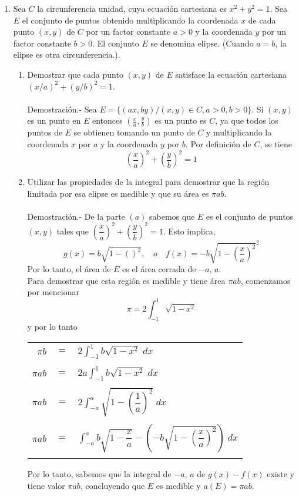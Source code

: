 \begin{enumerate}
\item Sea $C$ la circunferencia unidad, cuya ecuación cartesiana es $x^2+y^2 = 1$. Sea $E$ el conjunto de puntos obtenido multiplicando la coordenada $x$ de cada punto $(x,y)$ de $C$ por un factor constante $a>0$ y la coordenada $y$ por un factor constante $b>0$. El conjunto $E$ se denomina elipse. (Cuando $a=b$, la elipse es otra circunferencia.).


\begin{enumerate}[\bfseries a)]

    \item Demostrar que cada punto $(x,y)$ de $E$ satisface la ecuación cartesiana $(x/a)^2+(y/b)^2 = 1$.\\\\
	Demostración.-\; Sea $E=\lbrace (ax,by) / (x,y) \in C, a>0,b>0 \rbrace$. Si $(x,y)$ es un punto en $E$ entonces $\left(\frac{x}{a},\frac{y}{b}\right)$ es un punto es $C$, ya que todos los puntos de $E$ se obtienen tomando un punto de $C$ y multiplicando la coordenada $x$ por $a$ y la coordenada $y$ por $b$. Por definición de $C$, se tiene $$\left(\dfrac{x}{a}\right)^2+\left(\dfrac{y}{b}\right)^2 = 1$$

    \item Utilizar las propiedades de la integral para demostrar que la región limitada por esa elipse es medible y que su área es $\pi ab$.\\\\
	Demostración.-\; De la parte $(a)$ sabemos que $E$ es el conjunto de puntos $(x,y)$ tales que $\left(\dfrac{x}{a}\right)^2 + \left(\dfrac{y}{b}\right)^2 = 1$. Esto implica, $$g(x)=b\sqrt{1-\left(\right)^2}, \quad o \quad f(x)=-b\sqrt{1-\left(\dfrac{x}{a}\right)^2}^2$$
	Por lo tanto, el área de $E$ es el área cerrada de $-a$, $a$.\\
	Para demostrar que esta región es medible y tiene área $\pi ab$, comenzamos por mencionar $$\pi = 2\int_{-1}^1 \sqrt{1-x^2}$$ 
	y por lo tanto 
	\begin{center}
	    \begin{tabular}{rcl}
		$\pi b$ & $=$ & $2\displaystyle\int_{-1}^1 b\sqrt{1-x^2}\; dx$\\\\
		$\pi ab$ & $=$ & $2a\displaystyle\int_{-1}^1 b\sqrt{1-x^2}\; dx$\\\\
		$\pi ab$ & $=$ & $2\displaystyle\int_{-a}^a \sqrt{1 - \left(\dfrac{1}{a}\right)^2} \; dx$\\\\
		$\pi ab$ & $=$ & $\displaystyle\int_{-a}^a b\sqrt{1 - \dfrac{x}{a}} - \left(-b\sqrt{1-\left(\dfrac{x}{a}\right)^2}\right) \; dx$\\\\
	    \end{tabular}
	\end{center}
	Por lo tanto, sabemos que la integral de $-a$, $a$ de $g(x)-f(x)$ existe y tiene valor $\pi ab$, concluyendo que $E$ es medible y $a(E)=\pi ab$.\\\\


\end{enumerate}
\end{enumerate}

